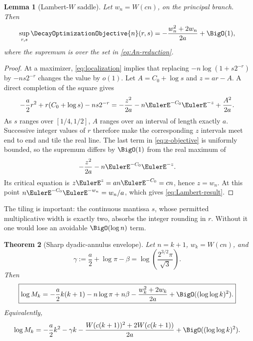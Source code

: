 \documentclass[11pt,oneside]{article}
\newtheorem{theorem}{Theorem}[section]
\newtheorem{lemma}[theorem]{Lemma}
\theoremstyle{definition}
\theoremstyle{remark}
\newcommand{\LambertW}{W}
\begin{document}
\begin{lemma}[Lambert-$W$ saddle]
\label{lem:Lambert}
Let $w_n=\LambertW(cn)$, on the principal branch.  Then
\begin{equation}
 \sup_{r,s}\DecayOptimizationObjective{n}(r,s)
 =-\frac{w_n^2+2w_n}{2a}+\BigO(1),
 \label{eq:Lambert-result}
\end{equation}
where the supremum is over the set in \eqref{eq:An-reduction}.
\end{lemma}

\begin{proof}
At a maximizer, \eqref{eq:localization} implies that replacing
$-n\log(1+s2^{-r})$ by $-ns2^{-r}$ changes the value by $o(1)$.  Let
$A=C_0+\log s$ and $z=ar-A$.  A direct completion of the square gives
\begin{equation}
 -\frac a2r^2+r(C_0+\log s)-ns2^{-r}
 =-\frac{z^2}{2a}-n\EulerE^{-C_0}\EulerE^{-z}+\frac{A^2}{2a}.
 \label{eq:z-objective}
\end{equation}
As $s$ ranges over $[1/4,1/2]$, $A$ ranges over an interval of length exactly
$a$.  Successive integer values of $r$ therefore make the corresponding
$z$ intervals meet end to end and tile the real line.  The last term in
\eqref{eq:z-objective} is uniformly bounded, so the supremum differs by
$\BigO(1)$ from the real maximum of
\[
 -\frac{z^2}{2a}-n\EulerE^{-C_0}\EulerE^{-z}.
\]
Its critical equation is $z\EulerE^z=an\EulerE^{-C_0}=cn$, hence $z=w_n$.  At this
point $n\EulerE^{-C_0}\EulerE^{-w_n}=w_n/a$, which gives
\eqref{eq:Lambert-result}.
\end{proof}

The tiling is important: the continuous mantissa $s$, whose permitted
multiplicative width is exactly two, absorbs the integer rounding in $r$.
Without it one would lose an avoidable $\BigO(\log n)$ term.

\begin{theorem}[Sharp dyadic-annulus envelope]
\label{thm:annular-main}
Let $n=k+1$, $w_k=\LambertW(cn)$, and
\begin{equation}
 \gamma:=\frac a2+\log\pi-\beta
 =\log\!\left(\frac{2^{3/2}\pi}{\sqrt3}\right).
 \label{eq:gamma}
\end{equation}
Then
\begin{equation}
 \boxed{
 \log M_k=
 -\frac a2k(k+1)-n\log\pi+n\beta
 -\frac{w_k^2+2w_k}{2a}
 +\BigO((\log\log k)^2).}
 \label{eq:annular-centered}
\end{equation}
Equivalently,
\begin{equation}
 \log M_k=
 -\frac a2k^2-\gamma k
 -\frac{\LambertW(c(k+1))^2+2\LambertW(c(k+1))}{2a}
 +\BigO((\log\log k)^2).
 \label{eq:annular-compact}
\end{equation}
\end{theorem}
\end{document}

